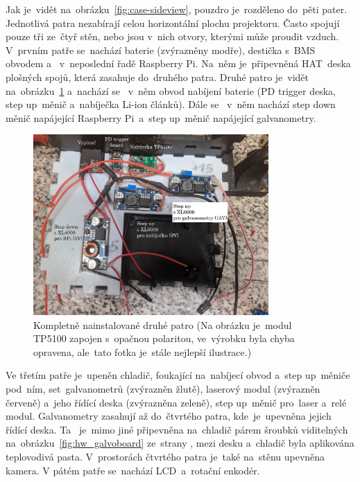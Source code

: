 Jak je~vidět na~obrázku~\ref{fig:case-sideview}, pouzdro je~rozděleno do~pěti pater. Jednotlivá patra nezabírají celou horizontální plochu projektoru. Často spojují pouze tři ze~čtyř stěn, nebo jsou v~nich otvory, kterými může proudit vzduch. V~prvním patře se~nachází baterie (zvýrazněny modře), destička s~BMS obvodem a ~v~neposlední řadě Raspberry Pi.
Na~něm je~připevněná HAT~deska plošných spojů, která zasahuje do~druhého patra. Druhé patro je~vidět na~obrázku~\ref{fig:hw_layer0} a~nachází se ~v~něm obvod nabíjení baterie (PD trigger deska, step up~měnič a~nabíječka Li-ion článků).
Dále se ~v~něm nachází step down měnič napájející Raspberry Pi~a~step up~měnič napájející galvanometry.
\begin{figure}[htb]
  \centering
  \includegraphics[width=0.8\textwidth]{img/hw_layer0.jpg}
  \caption{\label{fig:hw_layer0} Kompletně nainstalované druhé patro (Na obrázku je~modul TP5100 zapojen s~opačnou polaritou, ve~výrobku byla chyba opravena, ale~tato fotka je~stále nejlepší ilustrace.)}
\end{figure}

Ve třetím patře je~upeněn chladič, foukající na~nabíjecí obvod a~step up~měniče pod~ním, set~galvanometrů (zvýrazněn žlutě), laserový modul (zvýrazněn červeně) a~jeho řídící deska (zvýrazněna zeleně), step up~měnič pro~laser a~relé modul.  
Galvanometry zasahují až do~čtvrtého patra, kde~je~upevněna jejich řídící deska. Ta ~je~mimo jiné připevněna na~chladič párem šroubků viditelných na~obrázku~\ref{fig:hw_galvoboard} ze~strany \pageref{fig:hw_galvoboard}, mezi desku a~chladič byla aplikována teplovodivá pasta. V~prostorách čtvrtého patra je~také na~stěnu upevněna kamera.
V pátém patře se~nachází LCD~a~rotační enkodér.

